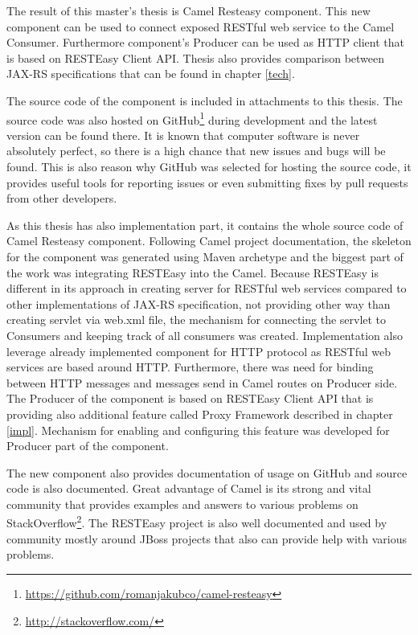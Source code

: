 \documentclass[12pt,final,oneside]{fithesis2}
\begin{document}
The result of this master's thesis is Camel Resteasy component. This new component can be used to connect exposed RESTful web service to the Camel Consumer. Furthermore component's Producer can be used as HTTP client that is based on RESTEasy Client API. Thesis also provides comparison between JAX-RS specifications that can be found in chapter \ref{tech}. 

The source code of the component is included in attachments to this thesis. The source code was also hosted on GitHub\footnote{\url{https://github.com/romanjakubco/camel-resteasy}} during development and the latest version can be found there. It is known that computer software is never absolutely perfect, so there is a high chance that new issues and bugs will be found. This is also reason why GitHub was selected for hosting the source code, it provides useful tools for reporting issues or even submitting fixes by pull requests from other developers.  

As this thesis has also implementation part, it contains the whole source code of Camel Resteasy component. Following Camel project documentation, the skeleton for the component was generated using Maven archetype and the biggest part of the work was integrating RESTEasy into the Camel. Because RESTEasy is different in its approach in creating server for RESTful web services compared to other implementations of JAX-RS specification, not providing other way than creating servlet via web.xml file, the mechanism for connecting the servlet to Consumers and keeping track of all consumers was created. Implementation also leverage already implemented component for HTTP protocol as RESTful web services are based around HTTP. Furthermore, there was need for binding between HTTP messages and messages send in Camel routes on Producer side. The Producer of the component is based on RESTEasy Client API that is providing also additional feature called Proxy Framework described in chapter \ref{impl}. Mechanism for enabling and configuring this feature was developed for Producer part of the component.

The new component also provides documentation of usage on GitHub and source code is also documented. Great advantage of Camel is its strong and vital community that provides examples and answers to various problems on StackOverflow\footnote{\url{http://stackoverflow.com/}}. The RESTEasy project is also well documented and used by community mostly around JBoss projects that also can provide help with various problems.
\end{document}
